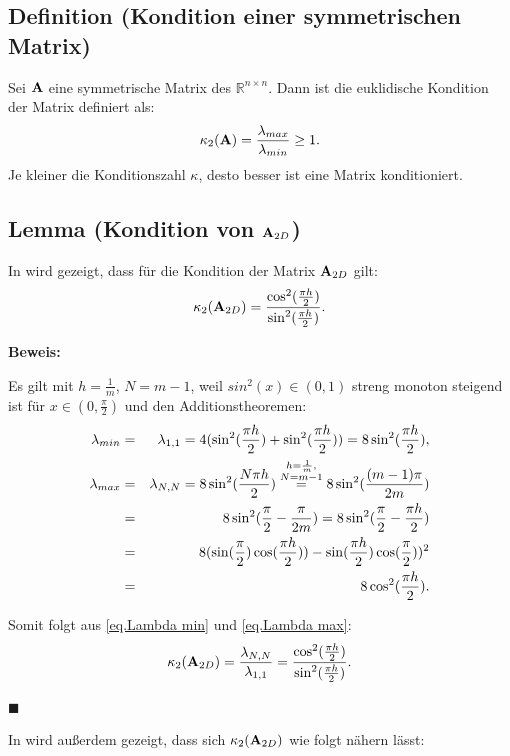 \subsection{Definition (Kondition einer symmetrischen Matrix)}\label{ss.Definition Kondition einer Matrix}

Sei ${\textbf{A}}$ eine symmetrische Matrix des $\mathbb{R}^{n \times n}$. Dann ist die euklidische Kondition der Matrix definiert als:
\begin{equation}
\kappa_{2} ({\textbf{A}}) = \frac {\lambda_{max}} {\lambda_{min}} \ge 1.\label{eq.Kondition}
\end{equation}
Je kleiner die Konditionszahl $\kappa$, desto besser ist eine Matrix konditioniert.

\subsection{Lemma (Kondition von ${\textbf{A}}_{2D}$)}\label{ss.Matrixkondition}

In \cite{DR2} wird gezeigt, dass für die Kondition der Matrix ${\textbf{A}}_{2D}$ gilt:
\begin{equation}
\kappa_{2} ({\textbf{A}}_{2D}) = \frac {\cos^{2}(\frac{\pi h}{2})} {\sin^{2}(\frac{\pi h}{2})}.
\end{equation}

\textbf{Beweis:}

Es gilt mit $h = \frac{1}{m}$, $N = m - 1$, weil $sin^{2}(x) \in (0,1)$ streng monoton steigend ist für $x \in (0,\frac{\pi}{2})$ und den Additionstheoremen:
\begin{eqnarray}
\lambda_{min} &=& \lambda_{1,1} = 4 (\sin^{2}(\frac{\pi h}{2}) + \sin^{2}(\frac{\pi h}{2})) = 8\sin^{2}(\frac{\pi h}{2}),\label{eq.Lambda min}\\
\lambda_{max} &=& \lambda_{N,N} = 8\sin^{2}(\frac{N\pi h}{2}) \overset{\substack{h=\frac {1} {m}, \\N=m-1}}{=} 8\sin^{2}(\frac{(m-1)\pi}{2m}) \notag \\
&=& 8\sin^{2}(\frac{\pi}{2} - \frac{\pi}{2m}) = 8\sin^{2}(\frac{\pi}{2} - \frac{\pi h}{2}) \notag \\
&=& 8(\sin(\frac{\pi}{2})\cos(\frac{\pi h}{2})) - \sin(\frac{\pi h}{2})\cos(\frac{\pi}{2}))^{2} \notag \\
&=& 8\cos^{2}(\frac{\pi h}{2}). \label{eq.Lambda max}
\end{eqnarray}

Somit folgt aus \autoref{eq.Lambda min} und \autoref{eq.Lambda max}:
\begin{equation}
\kappa_{2} ({\textbf{A}}_{2D}) = \frac {\lambda_{N,N}} {\lambda_{1,1}} = \frac {\cos^{2} (\frac {\pi h} {2})} {\sin^{2} (\frac {\pi h} {2})}. \notag
\end{equation}
\begin{flushright}
$\blacksquare$
\end{flushright}
In \cite{DR3} wird außerdem gezeigt, dass sich $\kappa_{2}({\textbf{A}}_{2D})$ wie folgt nähern lässt:

